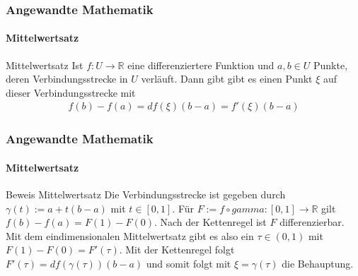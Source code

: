 \documentclass{beamer}
\begin{document}
\begin{frame}
    \frametitle{Angewandte Mathematik}
\framesubtitle{Mittelwertsatz}
    \begin{block}{Mittelwertsatz}
Ist $f: U \to \mathbb{R}$ eine differenziertere Funktion und $a,b \in U$ Punkte, deren Verbindungsstrecke in $U$ verläuft. Dann gibt gibt es einen Punkt $\xi$ auf dieser Verbindungsstrecke mit
\begin{align*}
f(b) - f(a) = df(\xi)(b-a) = f'(\xi) (b-a)
\end{align*}
\end{block}
 \end{frame}



\begin{frame}
    \frametitle{Angewandte Mathematik}
\framesubtitle{Mittelwertsatz}
    \begin{block}{Beweis Mittelwertsatz}
Die Verbindungsstrecke ist gegeben durch $\gamma(t) := a + t(b-a)$ mit $t \in [0,1]$. Für $F:= f \circ gamma : [0,1] \to \mathbb{R}$ gilt $f(b) - f(a)= F(1) - F(0)$.
Nach der Kettenregel ist $F$ differenzierbar. Mit dem eindimensionalen Mittelwertsatz gibt es also ein $\tau \in (0,1)$ mit
$F(1) - F(0) = F'(\tau)$. Mit der Kettenregel folgt $F'(\tau) = df(\gamma(\tau)) (b-a)$ und somit folgt mit $\xi= \gamma(\tau)$ die Behauptung.
\end{block}
 \end{frame}
\end{document}
